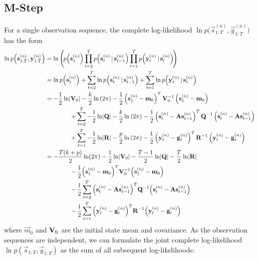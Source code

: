 \subsection{M-Step}
	For a single observation sequence, the complete log-likelihood \( \ln p\Big(\vec{s}_{1:T}^{(n)}, \vec{y}_{1:T}^{(n)}\Big) \) has the form
	\begin{align*}
		\ln p\Big(\vec{s}_{1:T}^{(n)}, \vec{y}_{1:T}^{(n)}\Big)
			&= \ln \Bigg(\! p\Big(\vec{s}_1^{(n)}\Big) \prod_{t = 2}^{T} p\Big(\vec{s}_t^{(n)} \given \vec{s}_{t - 1}^{(n)}\Big) \prod_{t = 1}^{T} p\Big(\vec{y}_t^{(n)} \given \vec{s}_t^{(n)}\Big) \!\Bigg) \\
			&= \ln p\Big(\vec{s}_1^{(n)}\Big) + \sum_{t = 2}^{T} \ln p\Big(\vec{s}_t^{(n)} \given \vec{s}_{t - 1}^{(n)}\Big) + \sum_{t = 1}^{T} \ln p\Big(\vec{y}_t^{(n)} \given \vec{s}_t^{(n)}\Big) \\
			&= \logGaussianMulti{\vec{s}_1^{(n)}}{\vec{m}_0}{\mat{V}_0}{k} \\
				&\qquad\qquad + \sum_{t = 2}^{T} \logGaussianMulti{\vec{s}_t^{(n)}}{\mat{A} \vec{s}_{t - 1}^{(n)}}{\mat{Q}}{k} \\
				&\qquad\qquad + \sum_{t = 1}^{T} \logGaussianMulti{\vec{y}_t^{(n)}}{\vec{g}_t^{(n)}}{\mat{R}}{p} \\
			&= -\frac{T(k + p)}{2} \ln(2\pi) - \frac{1}{2} \ln \lvert \mat{V}_0 \rvert - \frac{T - 1}{2} \ln \lvert \mat{Q} \rvert - \frac{T}{2} \ln \lvert \mat{R} \rvert \\
				&\qquad\qquad -\frac{1}{2} \Big( \vec{s}_1^{(n)} - \vec{m}_0 \Big)^T \mat{V}_0^{-1} \Big( \vec{s}_1^{(n)} - \vec{m}_0 \Big) \\
				&\qquad\qquad -\frac{1}{2} \sum_{t = 2}^{T} \Big( \vec{s}_t^{(n)} - \mat{A} \vec{s}_{t - 1}^{(n)} \Big)^T \mat{Q}^{-1} \Big( \vec{s}_t^{(n)} - \mat{A} \vec{s}_{t - 1}^{(n)} \Big) \\
				&\qquad\qquad -\frac{1}{2} \sum_{t = 1}^{T} \Big( \vec{y}_t^{(n)} - \vec{g}_t^{(n)} \Big)^T \mat{R}^{-1} \Big( \vec{y}_t^{(n)} - \vec{g}_t^{(n)} \Big)
	\end{align*}
	where \( \vec{m}_0 \) and \( \mat{V}_0 \) are the initial state mean and covariance. As the observation sequences are independent, we can formulate the joint complete log-likelihood \( \ln p(\vec{s}_{1:T}, \vec{y}_{1:T}) \) as the sum of all subsequent log-likelihoods:
